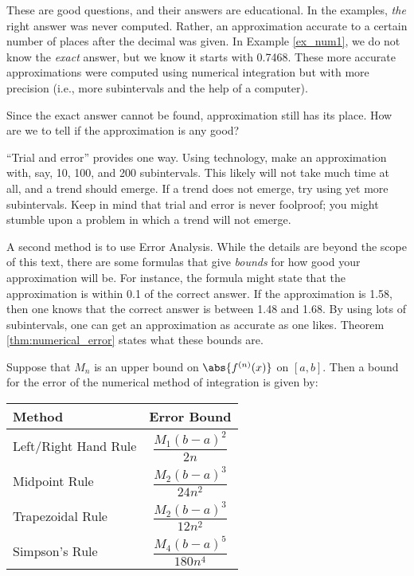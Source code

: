 These are good questions, and their answers are educational. In the examples, \textit{the} right answer was never computed. Rather, an approximation accurate to a certain number of places after the decimal was given. In Example \ref{ex_num1}, we do not know the \textit{exact} answer, but we know it starts with 0.7468. These more accurate approximations were computed using numerical integration but with more precision (i.e., more subintervals and the help of a computer). 

Since the exact answer cannot be found, approximation still has its place. How are we to tell if the approximation is any good?

``Trial and error'' provides one way. %
Using technology, make an approximation with, say, 10, 100, and 200 subintervals. This likely will not take much time at all, and a trend should emerge. If a trend does not emerge, try using yet more subintervals. Keep in mind that trial and error is never foolproof; you might stumble upon a problem in which a trend will not emerge.

A second method is to use Error Analysis. While the details are beyond the scope of this text, there are some formulas that give \textit{bounds} for how good your approximation will be. For instance, the formula might state that the approximation is within 0.1 of the correct answer. If the approximation is 1.58, then one knows that the correct answer is between 1.48 and 1.68. By using lots of subintervals, one can get an approximation as accurate as one likes. Theorem \ref{thm:numerical_error} states what these bounds are.

%
{Suppose that $M_n$ is an upper bound on $\abs{f^{(n)}(x)}$ on $[a,b]$.  Then a bound for the error of the numerical method of integration is given by:
\begin{center}
\begin{tabular}{lc}
Method & Error Bound \\\hline
Left/Right Hand Rule & $\dfrac{M_1(b-a)^2}{2n}$ \\
Midpoint Rule & $\dfrac{M_2(b-a)^3}{24n^2}$ \\
Trapezoidal Rule & $\dfrac{M_2(b-a)^3}{12n^2}$ \\
Simpson's Rule & $\dfrac{M_4(b-a)^5}{180n^4}$
\end{tabular}
\end{center}}

